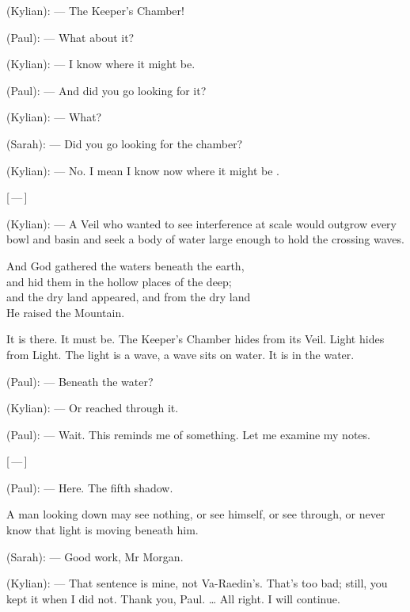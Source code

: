 \begin{room}

(Kylian): --- The Keeper's Chamber!

(Paul): --- What about it?

(Kylian): --- I know where it might be.

(Paul): --- And did you go looking for it?

(Kylian): --- What?

(Sarah): --- Did you go looking for the chamber?

(Kylian): --- No. I mean I know now where it might be .

\centerline{[\,---\,]}

(Kylian): --- A Veil who wanted to see interference at scale would outgrow every bowl and basin and seek a body of water large enough to hold the crossing waves.

\begin{scripture}
And God gathered the waters beneath the earth, \\
and hid them in the hollow places of the deep; \\
and the dry land appeared, and from the dry land \\
He raised the Mountain.
\end{scripture}

It is there. It must be. The Keeper's Chamber hides from its Veil. Light hides from Light. The light is a wave, a wave sits on water. It is in the water.

(Paul): --- Beneath the water?

(Kylian): --- Or reached through it.

(Paul): --- Wait. This reminds me of something. Let me examine my notes.

\centerline{[\,---\,]}

(Paul): --- Here. The fifth shadow.

\begin{scripture}
A man looking down may see nothing, or see himself, or see through, or never know that light is moving beneath him.
\end{scripture}

(Sarah): --- Good work, Mr Morgan.

(Kylian): --- That sentence is mine, not Va-Raedin's. That's too bad; still, you kept it when I did not. Thank you, Paul. \ldots{} All right. I will continue.

\end{room}

